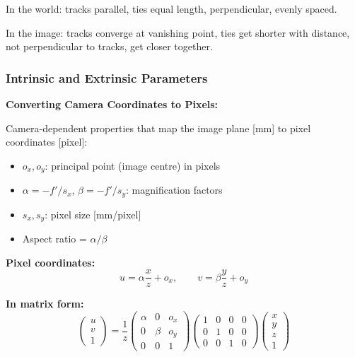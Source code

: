 \begin{exbox}
In the world: tracks parallel, ties equal length, perpendicular, evenly spaced.

In the image: tracks converge at vanishing point, ties get shorter with distance, not perpendicular to tracks, get closer together.
\end{exbox}

\bigseparator

\subsubsection{Intrinsic and Extrinsic Parameters}

\textbf{Converting Camera Coordinates to Pixels:}

\begin{defbox}
Camera-dependent properties that map the image plane [mm] to pixel coordinates [pixel]:
\begin{itemize}
  \item $o_x, o_y$: principal point (image centre) in pixels
  \item $\alpha = -f'/s_x$, $\beta = -f'/s_y$: magnification factors
  \item $s_x, s_y$: pixel size [mm/pixel]
  \item Aspect ratio = $\alpha/\beta$
\end{itemize}
\end{defbox}

\textbf{Pixel coordinates:}
\[
u = \alpha \frac{x}{z} + o_x, \qquad v = \beta \frac{y}{z} + o_y
\]

\textbf{In matrix form:}
\[
\begin{pmatrix} u \\ v \\ 1 \end{pmatrix} = \frac{1}{z} \begin{pmatrix} \alpha & 0 & o_x \\ 0 & \beta & o_y \\ 0 & 0 & 1 \end{pmatrix} \begin{pmatrix} 1 & 0 & 0 & 0 \\ 0 & 1 & 0 & 0 \\ 0 & 0 & 1 & 0 \end{pmatrix} \begin{pmatrix} x \\ y \\ z \\ 1 \end{pmatrix}
\]

